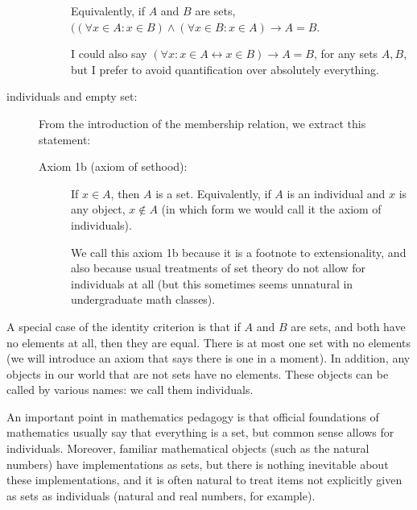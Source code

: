 \documentclass[12pt]{article}
\begin{document}
\begin{description}
\begin{description}
Equivalently, if $A$ and $B$ are sets, $((\forall x \in A: x\in B) \wedge (\forall x \in B:x \in A) \rightarrow A=B$.

I could also say $(\forall x:x \in A \leftrightarrow x \in B) \rightarrow A=B$, for any sets $A,B$, but I prefer to avoid quantification over absolutely everything.

\end{description}

\item[individuals and empty set:]   From the introduction of the membership relation, we extract this statement:  

\begin{description}
\item[Axiom 1b (axiom of sethood):]  If $x \in A$, then $A$ is a set.  Equivalently, if $A$ is an individual and $x$ is any object, $x \not\in A$ (in which form we would call it the axiom of individuals).

We call this axiom 1b because it is a footnote to extensionality, and also because usual treatments of set theory do not allow for individuals at all (but this sometimes seems unnatural in undergraduate math classes).
\end{description}

\end{description}

A special case of the identity criterion is that if $A$ and $B$ are sets, and both have no elements at all, then they are equal.   There is at most one set with no elements (we will introduce an axiom that says there is one in a moment).  In addition, any objects in our world that are not sets have no elements.  These objects can be called by various names:  we call them individuals.

An important point in mathematics pedagogy is that official foundations of mathematics usually say that everything is a set,  but common sense allows for individuals.  Moreover, familiar mathematical objects (such as the natural numbers) have implementations as sets, but there is nothing inevitable about these implementations, and it is often natural to treat items not explicitly given as sets as individuals (natural and real numbers, for example).

\newpage
\end{document}
